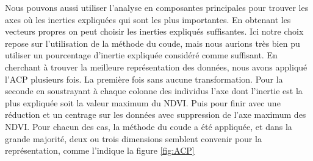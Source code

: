 \documentclass[twocolumn,10pt]{article}
\begin{document}
Nous pouvons aussi utiliser l'analyse en composantes principales pour trouver les axes où les inerties expliquées qui sont les plus importantes. En obtenant les vecteurs propres on peut choisir les inerties expliqués suffisantes. Ici notre choix repose sur l'utilisation de la méthode du coude, mais nous aurions très bien pu utiliser un pourcentage d'inertie expliquée considéré comme suffisant. En cherchant à trouver la meilleure représentation des données, nous avons appliqué l'ACP plusieurs fois. La première fois sans aucune transformation. Pour la seconde en soustrayant à chaque colonne des individus l'axe dont l'inertie est la plus expliquée soit la valeur maximum du NDVI. Puis pour finir avec une réduction et un centrage sur les données avec suppression de l'axe maximum des NDVI. Pour chacun des cas, la méthode du coude a été appliquée, et dans la grande majorité, deux ou trois dimensions semblent convenir pour la représentation, comme l'indique la figure \ref{fig:ACP}
\end{document}
